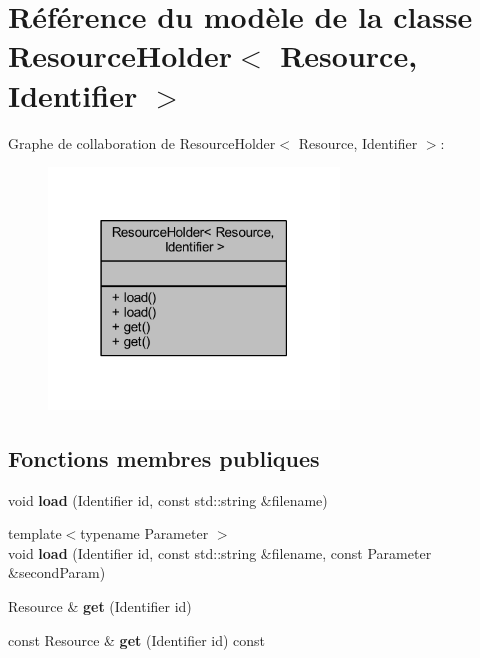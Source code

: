 \hypertarget{class_resource_holder}{}\section{Référence du modèle de la classe Resource\+Holder$<$ Resource, Identifier $>$}
\label{class_resource_holder}


Graphe de collaboration de Resource\+Holder$<$ Resource, Identifier $>$\+:\nopagebreak
\begin{figure}[H]
\begin{center}
\leavevmode
\includegraphics[width=219pt]{class_resource_holder__coll__graph}
\end{center}
\end{figure}
\subsection*{Fonctions membres publiques}
\begin{DoxyCompactItemize}
\item 
void {\bfseries load} (Identifier id, const std\+::string \&filename)\hypertarget{class_resource_holder_accb6a2b6bd2da503ddfd57b5c0028a16}{}\label{class_resource_holder_accb6a2b6bd2da503ddfd57b5c0028a16}

\item 
{\footnotesize template$<$typename Parameter $>$ }\\void {\bfseries load} (Identifier id, const std\+::string \&filename, const Parameter \&second\+Param)\hypertarget{class_resource_holder_ae83a7a88b2b2a74b6143796eb4452110}{}\label{class_resource_holder_ae83a7a88b2b2a74b6143796eb4452110}

\item 
Resource \& {\bfseries get} (Identifier id)\hypertarget{class_resource_holder_a6452638a75b6df7ea7d610f204632850}{}\label{class_resource_holder_a6452638a75b6df7ea7d610f204632850}

\item 
const Resource \& {\bfseries get} (Identifier id) const \hypertarget{class_resource_holder_a9cdb23504de69625ec8405e94a45448f}{}\label{class_resource_holder_a9cdb23504de69625ec8405e94a45448f}

\end{DoxyCompactItemize}


